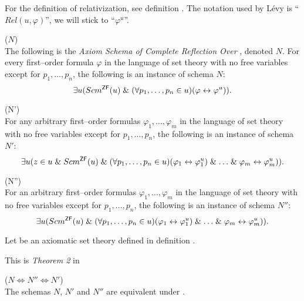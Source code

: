 For the definition of relativization, see definition . The notation used by Lévy is ``$Rel(u, \varphi)$'', we will stick to ``$\varphi^{u}$''.
\begin{definition}{($N$)}\label{def:levy_axiom_n}\\
The following is the \emph{Axiom Schema of Complete Reflection Over }, denoted $N$. For every first–order formula $\varphi$ in the language of set theory with no free variables except for $p_1, \ldots , p_n$, the following is an instance of schema $N$:
\begin{equation}
\exists u (Scm^{\sf{ZF}}(u) \mathrel{\&} (\forall p_1, \ldots, p_n \in u)(\varphi \leftrightarrow \varphi^{u}))\mbox{.}
\end{equation}
\end{definition}

\begin{definition}{(N')}\label{def:levy_axiom_n'}\\
For any arbitrary first–order formulas $\varphi_1, \ldots, \varphi_m$ in the language of set theory with no free variables except for $p_1, \ldots , p_n$, the following is an instance of schema $N'$:
\begin{equation}
\exists u (z \in u \mathrel{\&} Scm^{\sf{ZF}}(u) \mathrel{\&} (\forall p_1, \ldots, p_n \in u)(\varphi_1 \leftrightarrow \varphi_1^{u}) \mathrel{\&} \ldots \mathrel{\&} \varphi_m \leftrightarrow \varphi_m^{u}))\mbox{.}
\end{equation}
\end{definition}

\begin{definition}{(N'')}\label{def:levy_axiom_n''}\\
For an arbitrary first–order formulas $\varphi_1, \ldots, \varphi_m$ in the language of set theory with no free variables except for $p_1, \ldots , p_n$, the following is an instance of schema $N''$:
\begin{equation}
\exists u (Scm^{\sf{ZF}}(u) \mathrel{\&} (\forall p_1, \ldots, p_n \in u)(\varphi_1 \leftrightarrow \varphi_1^{u}) \mathrel{\&} \ldots \mathrel{\&} \varphi_m \leftrightarrow \varphi_m^{u}))\mbox{.}
\end{equation}
\end{definition}

Let  be an axiomatic set theory defined in definition .

This is \emph{Theorem 2} in \cite{Levy60a}
\begin{lemma}{($N \iff N'' \iff N'$)}\label{lemma:n_iff_n'}\\
The schemas $N$, $N'$ and $N''$ are equivalent under .
\end{lemma}

